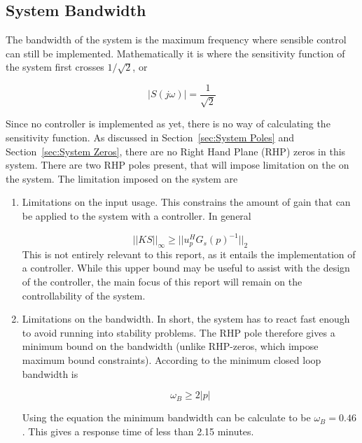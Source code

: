 \subsection{System Bandwidth}

The bandwidth of the system is the maximum frequency where sensible control can still be implemented. Mathematically it is where the sensitivity function of the system first crosses $1/\sqrt{2}$, or

\begin{equation}
	|S(j\omega)| = \frac{1}{\sqrt{2}}
\end{equation}

Since no controller is implemented as yet, there is no way of calculating the sensitivity function. As discussed in Section~\ref{sec:System Poles} and Section~\ref{sec:System Zeros}, there are no Right Hand Plane (RHP) zeros in this system. There are two RHP poles present, that will impose limitation on the on the system. The limitation imposed on the system are

\begin{enumerate}
	\item Limitations on the input usage. This constrains the amount of gain that can be applied to the system with a controller. In general
	
	\begin{equation}
		||KS||_{\infty} \geq ||u^H_p G_s(p)^{-1}||_2
	\end{equation}
	This is not entirely relevant to this report, as it entails the implementation of a controller. While this upper bound may be useful to assist with the design of the controller, the main focus of this report will remain on the controllability of the system.
	
	\item Limitations on the bandwidth. In short, the system has to react fast enough to avoid running into stability problems. The RHP pole therefore gives a minimum bound on the bandwidth (unlike RHP-zeros, which impose maximum bound constraints). According to \textcite{skogestad} the minimum closed loop bandwidth is 
	
	\begin{equation}
		\omega_B \geq 2|p|
	\end{equation}
	
	Using the equation the minimum bandwidth can be calculate to be $\omega_B = 0.46$. This gives a response time of less than 2.15 minutes.
\end{enumerate}

